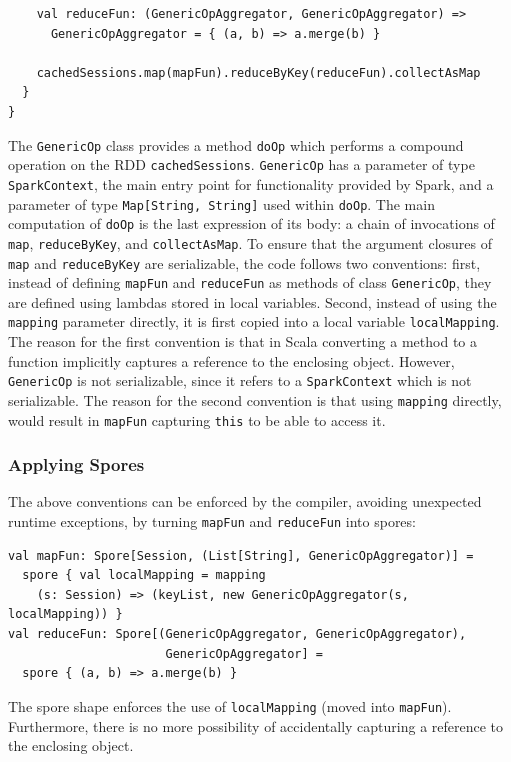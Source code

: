 \documentclass[runningheads]{llncs}
\begin{document}
\begin{sloppypar}
\begin{lstlisting}
    val reduceFun: (GenericOpAggregator, GenericOpAggregator) =>
      GenericOpAggregator = { (a, b) => a.merge(b) }

    cachedSessions.map(mapFun).reduceByKey(reduceFun).collectAsMap
  }
}
\end{lstlisting}
\noindent
The \verb|GenericOp| class provides a method \verb|doOp| which performs a compound operation on the RDD \verb|cachedSessions|. \verb|GenericOp| has a parameter of type \verb|SparkContext|, the main entry point for functionality provided by Spark, and a parameter of type \verb|Map[String, String]| used within \verb|doOp|. The main computation of \verb|doOp| is the last expression of its body: a chain of invocations of \verb|map|, \verb|reduceByKey|, and \verb|collectAsMap|. To ensure that the argument closures of \verb|map| and \verb|reduceByKey| are serializable, the code follows two conventions: first, instead of defining \verb|mapFun| and \verb|reduceFun| as methods of class \verb|GenericOp|, they are defined using lambdas stored in local variables. Second, instead of using the \verb|mapping| parameter directly, it is first copied into a local variable \verb|localMapping|. The reason for the first convention is that in Scala converting a method to a function implicitly captures a reference to the enclosing object. However, \verb|GenericOp| is not serializable, since it refers to a \verb|SparkContext| which is not serializable. The reason for the second convention is that using \verb|mapping| directly, would result in \verb|mapFun| capturing \verb|this| to be able to access it.

\subsubsection{Applying Spores}

The above conventions can be enforced by the compiler, avoiding unexpected runtime exceptions, by turning \verb|mapFun| and \verb|reduceFun| into spores:

\begin{lstlisting}
val mapFun: Spore[Session, (List[String], GenericOpAggregator)] =
  spore { val localMapping = mapping
    (s: Session) => (keyList, new GenericOpAggregator(s, localMapping)) }
val reduceFun: Spore[(GenericOpAggregator, GenericOpAggregator),
                      GenericOpAggregator] =
  spore { (a, b) => a.merge(b) }
\end{lstlisting}
\noindent
The spore shape enforces the use of \verb|localMapping| (moved into \verb|mapFun|). Furthermore, there is no more possibility of accidentally capturing a reference to the enclosing object.



\end{sloppypar}
\end{document}

